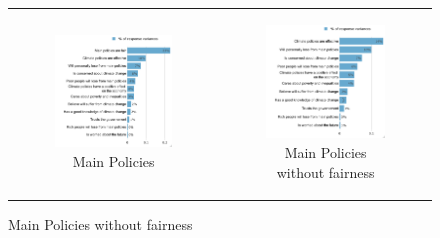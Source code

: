 \documentclass{article}
\begin{document}
\begin{figure}[h!]
\begin{center}
	\begin{tabular}{cc}
		\begin{subfigure}{0.5\textwidth}
		\caption{Main Policies}
			\includegraphics[width=\textwidth]{lmg_main_policies_indices_non_standardized}
		\end{subfigure}&
		\begin{subfigure}{0.5\textwidth}
		\caption{Main Policies without fairness}
			\includegraphics[width=\textwidth]{lmg_main_policies_indices_no_fairness_non_standardized}
		\end{subfigure}\\
	\end{tabular}
\end{center}
\end{figure}
\end{document}
